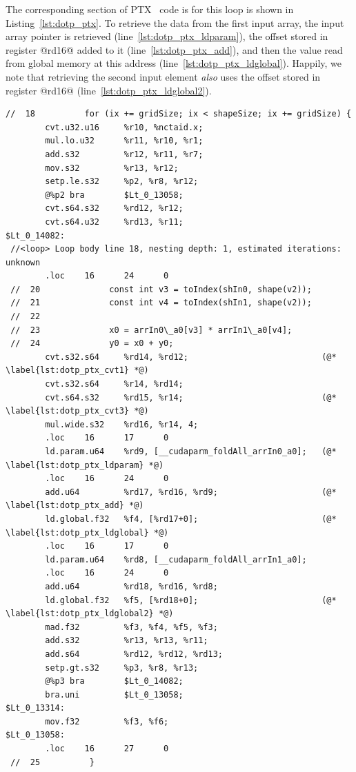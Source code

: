 The corresponding section of PTX~\cite{NVIDIA:2012vj} code is for this loop is
shown in Listing~\ref{lst:dotp_ptx}. To retrieve the data from the first input
array, the input array pointer is retrieved (line~\ref{lst:dotp_ptx_ldparam}),
the offset stored in register @rd16@ added to it
(line~\ref{lst:dotp_ptx_add}), and then the value read from global memory at
this address (line~\ref{lst:dotp_ptx_ldglobal}). Happily, we note that
retrieving the second input element \emph{also} uses the offset stored in
register @rd16@ (line~\ref{lst:dotp_ptx_ldglobal2}).
%
\begin{lstlisting}[style=ptx
    ,float
    ,firstnumber=103
    ,label=lst:dotp_ptx
    ,caption={[Corresponding PTX code for the first step of fused dot product]
        Corresponding PTX code for the first step of fused dot product (sm13)}]
 //  18          for (ix += gridSize; ix < shapeSize; ix += gridSize) {
        cvt.u32.u16     %r10, %nctaid.x;
        mul.lo.u32      %r11, %r10, %r1;
        add.s32         %r12, %r11, %r7;
        mov.s32         %r13, %r12;
        setp.le.s32     %p2, %r8, %r12;
        @%p2 bra        $Lt_0_13058;
        cvt.s64.s32     %rd12, %r12;
        cvt.s64.u32     %rd13, %r11;
$Lt_0_14082:
 //<loop> Loop body line 18, nesting depth: 1, estimated iterations: unknown
        .loc    16      24      0
 //  20              const int v3 = toIndex(shIn0, shape(v2));
 //  21              const int v4 = toIndex(shIn1, shape(v2));
 //  22
 //  23              x0 = arrIn0\_a0[v3] * arrIn1\_a0[v4];
 //  24              y0 = x0 + y0;
        cvt.s32.s64     %rd14, %rd12;                           (@* \label{lst:dotp_ptx_cvt1} *@)
        cvt.s32.s64     %r14, %rd14;
        cvt.s64.s32     %rd15, %r14;                            (@* \label{lst:dotp_ptx_cvt3} *@)
        mul.wide.s32    %rd16, %r14, 4;
        .loc    16      17      0
        ld.param.u64    %rd9, [__cudaparm_foldAll_arrIn0_a0];   (@* \label{lst:dotp_ptx_ldparam} *@)
        .loc    16      24      0
        add.u64         %rd17, %rd16, %rd9;                     (@* \label{lst:dotp_ptx_add} *@)
        ld.global.f32   %f4, [%rd17+0];                         (@* \label{lst:dotp_ptx_ldglobal} *@)
        .loc    16      17      0
        ld.param.u64    %rd8, [__cudaparm_foldAll_arrIn1_a0];
        .loc    16      24      0
        add.u64         %rd18, %rd16, %rd8;
        ld.global.f32   %f5, [%rd18+0];                         (@* \label{lst:dotp_ptx_ldglobal2} *@)
        mad.f32         %f3, %f4, %f5, %f3;
        add.s32         %r13, %r13, %r11;
        add.s64         %rd12, %rd12, %rd13;
        setp.gt.s32     %p3, %r8, %r13;
        @%p3 bra        $Lt_0_14082;
        bra.uni         $Lt_0_13058;
$Lt_0_13314:
        mov.f32         %f3, %f6;
$Lt_0_13058:
        .loc    16      27      0
 //  25          }
\end{lstlisting}

